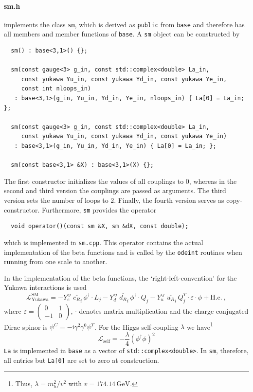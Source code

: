 \documentclass[preprint,12pt]{elsarticle}
\begin{document}
\paragraph{sm.h}
implements the class \texttt{sm}, which is derived as \texttt{public} from \texttt{base} and therefore has all members and member functions of \texttt{base}. A \texttt{sm} object can be constructed by
\begin{lstlisting}
  sm() : base<3,1>() {};
  
  sm(const gauge<3> g_in, const std::complex<double> La_in,
     const yukawa Yu_in, const yukawa Yd_in, const yukawa Ye_in,
     const int nloops_in)
   : base<3,1>(g_in, Yu_in, Yd_in, Ye_in, nloops_in) { La[0] = La_in; };
   
  sm(const gauge<3> g_in, const std::complex<double> La_in,
     const yukawa Yu_in, const yukawa Yd_in, const yukawa Ye_in)
   : base<3,1>(g_in, Yu_in, Yd_in, Ye_in) { La[0] = La_in; };
   
  sm(const base<3,1> &X) : base<3,1>(X) {};
\end{lstlisting}
The first constructor initializes the values of all couplings to $0$, whereas in the second and third version the couplings are passed as arguments. The third version sets the number of loops to $2$.
Finally, the fourth version serves as copy-constructor.
Furthermore, \texttt{sm} provides the operator
\begin{lstlisting}
  void operator()(const sm &X, sm &dX, const double);
\end{lstlisting}
which is implemented in \texttt{sm.cpp}. This operator contains the actual implementation of the beta functions and is called by the \texttt{odeint} routines when running from one scale to another.

In the implementation of the beta functions, the `right-left-convention' for the Yukawa interactions is used
\begin{equation} \label{eq:sm_yuk}
    \mathcal{L}_{\mathrm{Yukawa}}^{\mathrm{SM}} = - Y_e^{ij}\; \overline{e_{R}}_{i} \, \phi^\dagger \cdot L_j
  - Y_d^{ij}\; \overline{d_{R}}_{i} \, \phi^\dagger \cdot Q_j
  - Y_u^{ij}\; \overline{u_{R}}_{i} \, Q_j^T \cdot \varepsilon \cdot \phi + \mathrm{H.c.}~,
\end{equation}
where $\varepsilon = \left(\begin{smallmatrix} 0 & 1 \\ -1 & 0 \end{smallmatrix}\right)$, $\cdot$ denotes matrix multiplication and the charge conjugated Dirac spinor is $\psi^C = -\mathrm{i}\gamma^2\gamma^0\psi^T$. For the Higgs self-coupling $\lambda$ we have\footnote{Thus, $\lambda = m_h^2/v^2$ with $v=174.14\,\mathrm{GeV}$.}
\begin{equation} \label{eq:sm_la}
  \mathcal{L}_{\mathrm{self}} = -\frac{\lambda}{4} (\phi^\dagger\phi)^2
\end{equation}
\texttt{La} is implemented in \texttt{base} as a vector of \texttt{std::complex<double>}. In \texttt{sm}, therefore, all entries but \texttt{La[0]} are set to zero at construction.
\end{document}
